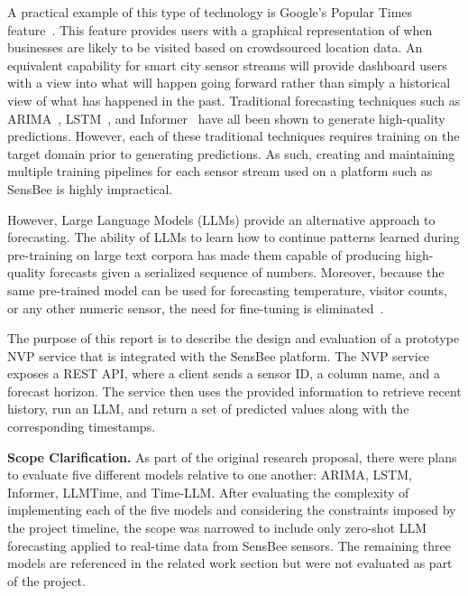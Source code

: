 \documentclass[11pt,a4paper]{article}
\begin{document}
A practical example of this type of technology is Google’s Popular Times feature~\cite{googlepopulartimes}. This feature provides users with a graphical representation of when businesses are likely to be visited based on crowdsourced location data. An equivalent capability for smart city sensor streams will provide dashboard users with a view into what will happen going forward rather than simply a historical view of what has happened in the past. Traditional forecasting techniques such as ARIMA~\cite{taslim2024arima}, LSTM~\cite{wei2019autoencoder}, and Informer~\cite{zhou2021informer} have all been shown to generate high-quality predictions. However, each of these traditional techniques requires training on the target domain prior to generating predictions. As such, creating and maintaining multiple training pipelines for each sensor stream used on a platform such as SensBee is highly impractical.

However, Large Language Models (LLMs) provide an alternative approach to forecasting. The ability of LLMs to learn how to continue patterns learned during pre-training on large text corpora has made them capable of producing high-quality forecasts given a serialized sequence of numbers. Moreover, because the same pre-trained model can be used for forecasting temperature, visitor counts, or any other numeric sensor, the need for fine-tuning is eliminated~\cite{gruver2023llmtime}.

The purpose of this report is to describe the design and evaluation of a prototype NVP service that is integrated with the SensBee platform. The NVP service exposes a REST API, where a client sends a sensor ID, a column name, and a forecast horizon. The service then uses the provided information to retrieve recent history, run an LLM, and return a set of predicted values along with the corresponding timestamps.

\textbf{Scope Clarification.}
As part of the original research proposal, there were plans to evaluate five different models relative to one another: ARIMA, LSTM, Informer, LLMTime, and Time-LLM. After evaluating the complexity of implementing each of the five models and considering the constraints imposed by the project timeline, the scope was narrowed to include only zero-shot LLM forecasting applied to real-time data from SensBee sensors. The remaining three models are referenced in the related work section but were not evaluated as part of the project.
\end{document}
